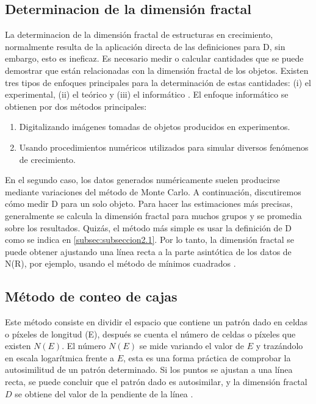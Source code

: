 \documentclass[11pt]{article}
\begin{document}
\subsection{Determinacion de la dimensi\'{o}n fractal}
\label{subsec:subseccion2.2}


La determinacion de la dimensi\'{o}n fractal de estructuras en crecimiento, normalmente resulta de la aplicaci\'{o}n directa de las definiciones para D, sin embargo, esto es ineficaz. Es necesario medir o calcular cantidades que se puede demostrar que est\'{a}n relacionadas con la dimensi\'{o}n fractal de los objetos. Existen  tres tipos de enfoques principales para la determinaci\'{o}n de estas cantidades: (i) el experimental, (ii) el te\'{o}rico y (iii) el inform\'{a}tico \cite{Vicsek1992}. El enfoque inform\'{a}tico se obtienen por dos m\'{e}todos principales: 


\begin{enumerate}
\item Digitalizando im\'{a}genes tomadas de objetos producidos en experimentos.
\item Usando procedimientos num\'{e}ricos utilizados para simular diversos fen\'{o}menos de crecimiento.
\end{enumerate}
 
  En el segundo caso, los datos generados num\'{e}ricamente suelen producirse mediante variaciones del m\'{e}todo de Monte Carlo. A continuaci\'{o}n, discutiremos c\'{o}mo medir D para un solo objeto. Para hacer las estimaciones m\'{a}s precisas, generalmente se calcula la dimensi\'{o}n fractal para muchos grupos y se promedia sobre los resultados. Quiz\'{a}s, el m\'{e}todo m\'{a}s simple es usar la definici\'{o}n de  D como se indica en \ref{subsec:subseccion2.1}. Por lo tanto, la dimensi\'{o}n fractal se puede obtener ajustando una l\'{i}nea recta a la parte asint\'{o}tica de los datos de  N(R), por ejemplo, usando el m\'{e}todo de m\'{i}nimos cuadrados \cite{Vicsek1992}.

\subsection{M\'{e}todo de conteo de cajas}

Este m\'{e}todo consiste en dividir el espacio que contiene un patr\'{o}n dado en celdas o p\'{i}xeles de longitud (E), despu\'{e}s se cuenta el n\'{u}mero de celdas o p\'{i}xeles que existen \(N(E)\). El n\'{u}mero \(N(E)\) se mide variando el valor de \(E\) y traz\'{a}ndolo en escala logar\'{i}tmica frente a \(E\), esta es una forma pr\'{a}ctica de comprobar la autosimilitud de un patr\'{o}n determinado. Si los puntos se ajustan a una l\'{i}nea recta, se puede concluir que el patr\'{o}n dado es autosimilar, y la dimensi\'{o}n fractal \(D\) se obtiene del valor de la pendiente de la l\'{i}nea \cite{Mustafa1996}. 
\end{document}
